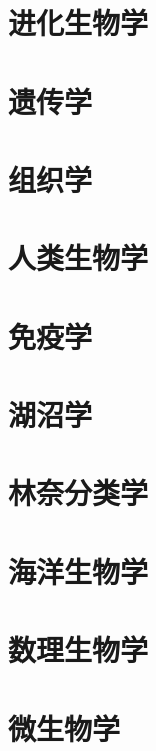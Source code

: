 \section{进化生物学}
\section{遗传学}
\section{组织学}
\section{人类生物学}
\section{免疫学}
\section{湖沼学}
\section{林奈分类学}
\section{海洋生物学}
\section{数理生物学}
\section{微生物学}

